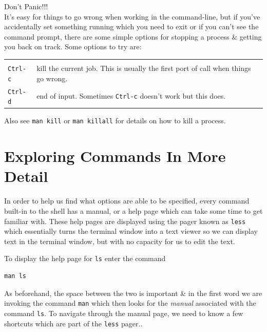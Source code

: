 \begin{warning}
{\Huge Don't Panic!!!}\\
It's easy for things to go wrong when working in the command-line, but if you've accidentally set something running which you need to exit or if you can't see the command prompt, there are some simple options for stopping a process \& getting you back on track.
Some options to try are: \\
\begin{tabular}{p{4cm} p{8cm}}
\centering
 & \\
 \texttt{Ctrl-c} & kill the current job.
  This is usually the first port of call when things go wrong. \\
 \texttt{Ctrl-d} & end of input. Sometimes \texttt{Ctrl-c} doesn't work but this does. \\
 \end{tabular}
Also see \texttt{man kill} or \texttt{man killall} for details on how to kill a process. \\
\end{warning}

\clearpage
\section{Exploring Commands In More Detail}

\begin{information}
In order to help us find what options are able to be specified, every command built-in to the shell has a manual, or a help page which can take some time to get familiar with.
These help pages are displayed using the pager known as \texttt{less} which essentially turns the terminal window into a text viewer so we can display text in the terminal window, but with no capacity for us to edit the text. \\
\end{information}

\begin{steps}
To display the help page for \texttt{ls} enter the command \\
\begin{lstlisting}
man ls
\end{lstlisting}
As beforehand, the space between the two is important \& in the first word we are invoking the command \texttt{man} which then looks for the \textit{manual} associated with the command \texttt{ls}.
To navigate through the manual page, we need to know a few shortcuts which are part of the \texttt{less} pager.. \\
\end{steps}

